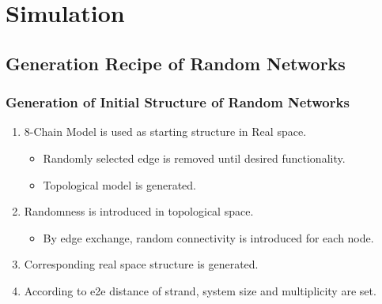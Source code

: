 \documentclass[12pt, dvipdfmx]{beamer}
\begin{document}
\section{Simulation}
\subsection{Generation Recipe of Random Networks}

\begin{frame}
	\frametitle{Generation of Initial Structure of Random Networks}
	\begin{enumerate}
		\item 8-Chain Model is used as starting structure in \alert{Real space}.
			\begin{itemize}
				\item Randomly selected edge is removed until desired functionality.
				\item Topological model is generated. 
			\end{itemize}
		\item Randomness is introduced in \alert{topological space}.
			\begin{itemize}
				\item By \alert{edge exchange}, random connectivity is introduced for each node.
			\end{itemize}	
		\item Corresponding real space structure is generated.
		\item According to e2e distance of strand, system size and multiplicity are set.
	\end{enumerate}


\end{frame}
\end{document}
